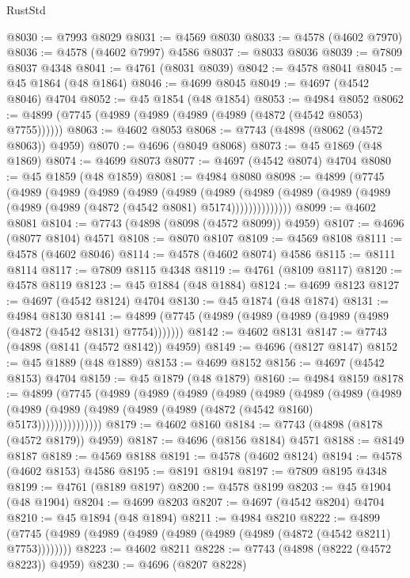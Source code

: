 \begin{lexlean}{RustStd}
\begin{coremodule}
@8030 := @7993 @8029
@8031 := @4569 @8030
@8033 := @4578 (@4602 @7970)
@8036 := @4578 (@4602 @7997) @4586
@8037 := @8033 @8036
@8039 := @7809 @8037 @4348
@8041 := @4761 (@8031 @8039)
@8042 := @4578 @8041
@8045 := @45 @1864 (@48 @1864)
@8046 := @4699 @8045
@8049 := @4697 (@4542 @8046) @4704
@8052 := @45 @1854 (@48 @1854)
@8053 := @4984 @8052
@8062 := @4899 (@7745 (@4989 (@4989 (@4989 (@4989 (@4872 (@4542 @8053) @7755))))))
@8063 := @4602 @8053
@8068 := @7743 (@4898 (@8062 (@4572 @8063)) @4959)
@8070 := @4696 (@8049 @8068)
@8073 := @45 @1869 (@48 @1869)
@8074 := @4699 @8073
@8077 := @4697 (@4542 @8074) @4704
@8080 := @45 @1859 (@48 @1859)
@8081 := @4984 @8080
@8098 := @4899
    (@7745
      (@4989
        (@4989
          (@4989
            (@4989
              (@4989
                (@4989
                  (@4989 (@4989 (@4989 (@4989 (@4989 (@4989 (@4872 (@4542 @8081) @5174))))))))))))))
@8099 := @4602 @8081
@8104 := @7743 (@4898 (@8098 (@4572 @8099)) @4959)
@8107 := @4696 (@8077 @8104) @4571
@8108 := @8070 @8107
@8109 := @4569 @8108
@8111 := @4578 (@4602 @8046)
@8114 := @4578 (@4602 @8074) @4586
@8115 := @8111 @8114
@8117 := @7809 @8115 @4348
@8119 := @4761 (@8109 @8117)
@8120 := @4578 @8119
@8123 := @45 @1884 (@48 @1884)
@8124 := @4699 @8123
@8127 := @4697 (@4542 @8124) @4704
@8130 := @45 @1874 (@48 @1874)
@8131 := @4984 @8130
@8141 := @4899 (@7745 (@4989 (@4989 (@4989 (@4989 (@4989 (@4872 (@4542 @8131) @7754)))))))
@8142 := @4602 @8131
@8147 := @7743 (@4898 (@8141 (@4572 @8142)) @4959)
@8149 := @4696 (@8127 @8147)
@8152 := @45 @1889 (@48 @1889)
@8153 := @4699 @8152
@8156 := @4697 (@4542 @8153) @4704
@8159 := @45 @1879 (@48 @1879)
@8160 := @4984 @8159
@8178 := @4899
    (@7745
      (@4989
        (@4989
          (@4989
            (@4989
              (@4989
                (@4989
                  (@4989
                    (@4989
                      (@4989 (@4989 (@4989 (@4989 (@4989 (@4872 (@4542 @8160) @5173)))))))))))))))
@8179 := @4602 @8160
@8184 := @7743 (@4898 (@8178 (@4572 @8179)) @4959)
@8187 := @4696 (@8156 @8184) @4571
@8188 := @8149 @8187
@8189 := @4569 @8188
@8191 := @4578 (@4602 @8124)
@8194 := @4578 (@4602 @8153) @4586
@8195 := @8191 @8194
@8197 := @7809 @8195 @4348
@8199 := @4761 (@8189 @8197)
@8200 := @4578 @8199
@8203 := @45 @1904 (@48 @1904)
@8204 := @4699 @8203
@8207 := @4697 (@4542 @8204) @4704
@8210 := @45 @1894 (@48 @1894)
@8211 := @4984 @8210
@8222 := @4899 (@7745 (@4989 (@4989 (@4989 (@4989 (@4989 (@4989 (@4872 (@4542 @8211) @7753))))))))
@8223 := @4602 @8211
@8228 := @7743 (@4898 (@8222 (@4572 @8223)) @4959)
@8230 := @4696 (@8207 @8228)

\end{coremodule}
\end{lexlean}
